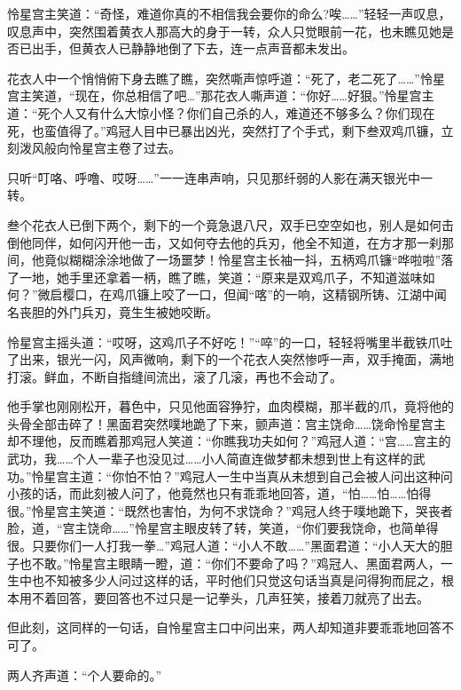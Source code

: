 \documentclass[12pt,oneside]{book}
\begin{document}
怜星宫主笑道：``奇怪，难道你真的不相信我会要你的命么?唉\ldots\ldots{}''轻轻一声叹息，叹息声中，突然围着黄衣人那高大的身于一转，众人只觉眼前一花，也未瞧见她是否已出手，但黄衣人已静静地倒了下去，连一点声音都未发出。

花衣人中一个悄悄俯下身去瞧了瞧，突然嘶声惊呼道：``死了，老二死了\ldots\ldots{}''怜星宫主笑道，``现在，你总相信了吧\ldots{}''那花衣人嘶声道：``你好\ldots\ldots 好狠。''怜星宫主道：``死个人又有什么大惊小怪？你们自己杀的人，难道还不够多么？你们现在死，也蛮值得了。''鸡冠人目中已暴出凶光，突然打了个手式，剩下叁双鸡爪镰，立刻泼风般向怜星宫主卷了过去。

只听``叮咯、呼噜、哎呀\ldots\ldots{}''一一连串声响，只见那纤弱的人影在满天银光中一转。

叁个花衣人已倒下两个，剩下的一个竟急退八尺，双手已空空如也，别人是如何击倒他同伴，如何闪开他一击，又如何夺去他的兵刃，他全不知道，在方才那一刹那间，他竟似糊糊涂涂地做了一场噩梦！怜星宫主长袖一抖，五柄鸡爪镰``哗啦啦''落了一地，她手里还拿着一柄，瞧了瞧，笑道：``原来是双鸡爪子，不知道滋味如何？''微启樱口，在鸡爪镰上咬了一口，但闻``喀''的一响，这精钢所铸、江湖中闻名丧胆的外门兵刃，竟生生被她咬断。

怜星宫主摇头道：``哎呀，这鸡爪子不好吃！''``啐''的一口，轻轻将嘴里半截铁爪吐了出来，银光一闪，风声微响，剩下的一个花衣人突然惨呼一声，双手掩面，满地打滚。鲜血，不断自指缝间流出，滚了几滚，再也不会动了。

他手掌也刚刚松开，暮色中，只见他面容狰狞，血肉模糊，那半截的爪，竟将他的头骨全部击碎了！黑面君突然噗地跪了下来，颤声道：宫主饶命\ldots\ldots 饶命怜星宫主却不理他，反而瞧着那鸡冠人笑道：``你瞧我功夫如何？''鸡冠人道：``宫\ldots\ldots 宫主的武功，我\ldots\ldots 个人一辈子也没见过\ldots\ldots 小人简直连做梦都未想到世上有这样的武功。''怜星宫主道：``你怕不怕？''鸡冠人一生中当真从未想到自己会被人问出这种问小孩的话，而此刻被人问了，他竟然也只有乖乖地回答，道，``怕\ldots\ldots 怕\ldots\ldots 怕得很。''怜星宫主笑道：``既然也害怕，为何不求饶命？''鸡冠人终于噗地跪下，哭丧者脸，道，``宫主饶命\ldots\ldots{}''怜星宫主眼皮转了转，笑道，``你们要我饶命，也简单得很。只要你们一人打我一拳\ldots{}''鸡冠人道：``小人不敢\ldots\ldots{}''黑面君道：``小人天大的胆子也不敢。''怜星宫主眼睛一瞪，道：``你们不要命了吗？''鸡冠人、黑面君两人，一生中也不知被多少人问过这样的话，平时他们只觉这句话当真是问得狗而屁之，根本用不着回答，要回答也不过只是一记拳头，几声狂笑，接着刀就亮了出去。

但此刻，这同样的一句话，自怜星宫主口中问出来，两人却知道非要乖乖地回答不可了。

两人齐声道：``个人要命的。''
\end{document}
